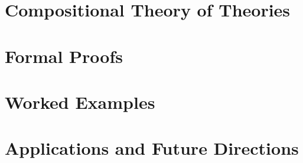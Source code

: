 \documentclass[12pt,openany]{book}
\theoremstyle{plain}
\theoremstyle{definition}
\theoremstyle{remark}
\begin{document}
\part{Compositional Theory of Theories}


\part{Formal Proofs}


\part{Worked Examples}


\part{Applications and Future Directions}


\backmatter
\end{document}
